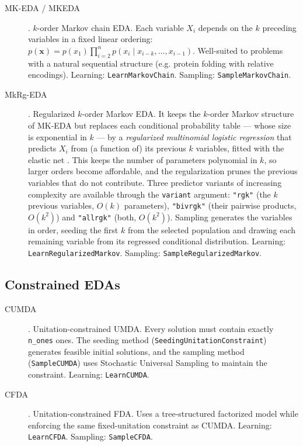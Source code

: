 \documentclass[a4paper,11pt]{article}
\begin{document}
\begin{description}
  \item[MK-EDA / MKEDA] \citep{Santana_et_al:2004}.
    $k$-order Markov chain EDA.  Each variable $X_i$ depends on the $k$
    preceding variables in a fixed linear ordering:
    $p(\mathbf{x}) = p(x_1)\prod_{i=2}^{n} p(x_i \mid x_{i-k}, \ldots, x_{i-1})$.
    Well-suited to problems with a natural sequential structure (e.g. protein folding with relative encodings).
    Learning: \texttt{LearnMarkovChain}. Sampling: \texttt{SampleMarkovChain}.

  \item[MkRg-EDA] \citep{Santana_et_al:2011reg}.
    Regularized $k$-order Markov EDA.  It keeps the $k$-order Markov structure of MK-EDA but replaces each conditional probability table --- whose size is exponential in $k$ --- by a \emph{regularized multinomial logistic regression} that predicts $X_i$ from (a function of) its previous $k$ variables, fitted with the elastic net \citep{Zou_and_Hastie:2005}.  This keeps the number of parameters polynomial in $k$, so larger orders become affordable, and the regularization prunes the previous variables that do not contribute.  Three predictor variants of increasing complexity are available through the \texttt{variant} argument: \texttt{"rgk"} (the $k$ previous variables, $O(k)$ parameters), \texttt{"bivrgk"} (their pairwise products, $O(k^2)$) and \texttt{"allrgk"} (both, $O(k^2)$).  Sampling generates the variables in order, seeding the first $k$ from the selected population and drawing each remaining variable from its regressed conditional distribution.
    Learning: \texttt{LearnRegularizedMarkov}. Sampling: \texttt{SampleRegularizedMarkov}.
\end{description}

\subsection{Constrained EDAs}
\label{sec:constrained}

\begin{description}
  \item[CUMDA] \citep{Santana_and_Ochoa:1999b}.
    Unitation-constrained UMDA.  Every solution must contain exactly \texttt{n\_ones} ones.  The seeding method
    (\texttt{SeedingUnitationConstraint}) generates feasible initial solutions, and the sampling method (\texttt{SampleCUMDA}) uses
    Stochastic Universal Sampling to maintain the constraint.
    Learning: \texttt{LearnCUMDA}.

  \item[CFDA] \citep{Santana_et_al:2001c}.
    Unitation-constrained FDA.  Uses a tree-structured factorized model while enforcing the same fixed-unitation constraint as CUMDA.
    Learning: \texttt{LearnCFDA}. Sampling: \texttt{SampleCFDA}.
\end{description}
\end{document}
